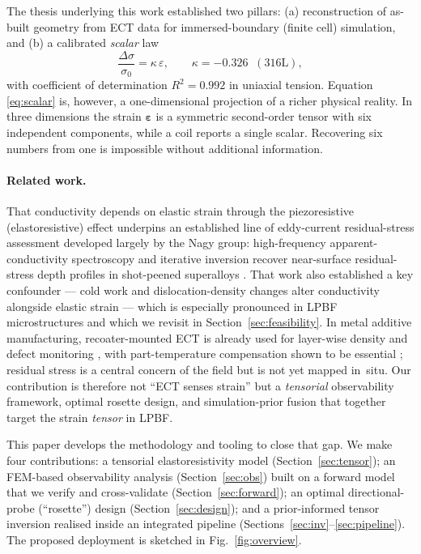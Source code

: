 \documentclass[11pt]{article}
\newcommand{\dsig}{\Delta\sigma}
\newcommand{\eps}{\bm{\varepsilon}}
\begin{document}
The thesis underlying this work \cite{ates2025} established two pillars: (a)
reconstruction of as-built geometry from ECT data for immersed-boundary (finite
cell) simulation, and (b) a calibrated \emph{scalar} law
\begin{equation}
  \frac{\dsig}{\sigma_0} = \kappa\,\varepsilon, \qquad \kappa = -0.326
  \;\; (\text{316L}),
  \label{eq:scalar}
\end{equation}
with coefficient of determination $R^2=0.992$ in uniaxial tension. Equation
\eqref{eq:scalar} is, however, a one-dimensional projection of a richer physical
reality. In three dimensions the strain $\eps$ is a symmetric second-order tensor
with six independent components, while a coil reports a single scalar. Recovering
six numbers from one is impossible without additional information.

\paragraph{Related work.} That conductivity depends on elastic strain through the
piezoresistive (elastoresistive) effect underpins an established line of
eddy-current residual-stress assessment developed largely by the Nagy group:
high-frequency apparent-conductivity spectroscopy and iterative inversion recover
near-surface residual-stress depth profiles in shot-peened superalloys
\cite{yu2004,abunabah2006,abunabah2007}. That work also established a key
confounder --- cold work and dislocation-density changes alter conductivity
alongside elastic strain --- which is especially pronounced in LPBF
microstructures and which we revisit in Section~\ref{sec:feasibility}. In metal
additive manufacturing, recoater-mounted ECT is already used for layer-wise
density and defect monitoring \cite{spurek2022,monu2025}, with part-temperature
compensation shown to be essential \cite{spurek2024}; residual stress is a
central concern of the field \cite{bartlett2019,withers2001} but is not yet mapped
in~situ.
Our contribution is therefore not ``ECT senses strain'' but a \emph{tensorial}
observability framework, optimal rosette design, and simulation-prior fusion that
together target the strain \emph{tensor} in LPBF.

This paper develops the methodology and tooling to close that gap. We make four
contributions: a tensorial elastoresistivity model (Section~\ref{sec:tensor}); an
FEM-based observability analysis (Section~\ref{sec:obs}) built on a forward model
that we verify and cross-validate (Section~\ref{sec:forward}); an optimal
directional-probe (``rosette'') design
(Section~\ref{sec:design}); and a prior-informed tensor inversion realised inside
an integrated pipeline (Sections~\ref{sec:inv}--\ref{sec:pipeline}). The proposed
deployment is sketched in Fig.~\ref{fig:overview}.
\end{document}
